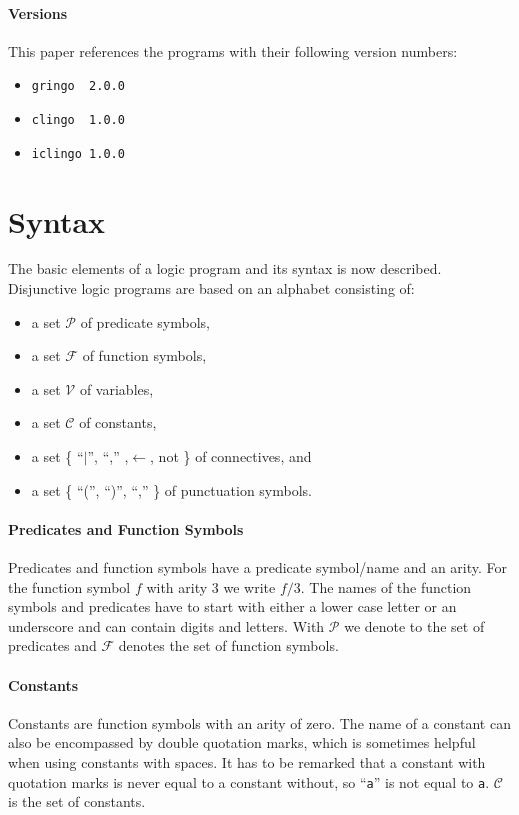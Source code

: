 \documentclass[a4paper,10pt]{article}
\begin{document}
\paragraph{Versions}
This paper references the programs with their following version numbers:
\begin{itemize}
 \item \texttt{gringo\ \ 2.0.0}
 \item \texttt{clingo\ \ 1.0.0}
 \item \texttt{iclingo\ 1.0.0}
\end{itemize}



\section{Syntax}
The basic elements of a logic program and its syntax is now described.
Disjunctive logic programs are based on an alphabet \cite{syntax} consisting of:
\begin{itemize}
\item a set $\mathcal{P}$ of predicate symbols,
\item a set $\mathcal{F}$ of function symbols,
\item a set $\mathcal{V}$ of variables,
\item a set $\mathcal{C}$ of constants,
\item a set \{ ``$\mid$'', ``,'' ,$\leftarrow$, not \} of connectives, and
\item a set \{ ``('', ``)'', ``,'' \} of punctuation symbols.
\end{itemize}

\paragraph{Predicates and Function Symbols}
Predicates and function symbols have a predicate symbol/name and an arity.
For the function symbol $f$ with arity 3 we write $f/3$.
The names of the function symbols and predicates have to start with either a lower case letter or an underscore and can contain digits and letters.
With $\mathcal{P}$ we denote to the set of predicates and $\mathcal{F}$ denotes the set of function symbols.
\paragraph{Constants}
Constants are function symbols with an arity of zero.
The name of a constant can also be encompassed by double quotation marks, which is sometimes helpful when using constants with spaces. It has to be remarked that a constant with quotation marks is never equal to a constant without, so ``\texttt{a}'' is not equal to \texttt{a}.
$\mathcal{C}$ is the set of constants.
\end{document}
